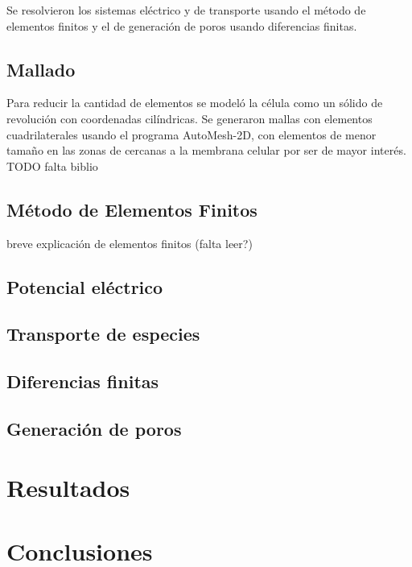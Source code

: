 \documentclass[a4paper,10pt]{article}
\begin{document}
Se resolvieron los sistemas eléctrico y de transporte usando el método de elementos finitos y el de generación de poros usando diferencias finitas.

\subsection{Mallado}
Para reducir la cantidad de elementos se modeló la célula como un sólido de revolución con coordenadas cilíndricas. Se generaron mallas con elementos cuadrilaterales usando el programa AutoMesh-2D, con elementos de menor tamaño en las zonas de cercanas a la membrana celular por ser de mayor interés.
TODO falta biblio

\subsection{Método de Elementos Finitos}
breve explicación de elementos finitos (falta leer?)

\subsection{Potencial eléctrico}

\subsection{Transporte de especies}

\subsection{Diferencias finitas}

\subsection{Generación de poros}



\section{Resultados}

\section{Conclusiones}
\end{document}
